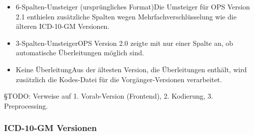 \begin{itemize}
\item 6-Spalten-Umsteiger (ursprüngliches Format)\newline Die Umsteiger für OPS Version 2.1 enthielen zusätzliche Spalten wegen Mehrfachverschlüsselung wie die älteren ICD-10-GM Versionen. 
\item 3-Spalten-Umsteiger\newline OPS Version 2.0 zeigte mit nur einer Spalte an, ob automatische Überleitungen möglich sind. 
\item Keine Überleitung\newline Aus der ältesten Version, die Überleitungen enthält, wird zusätzlich die Kodes-Datei für die Vorgänger-Versionen verarbeitet.
\end{itemize}

{\color{blue} §TODO: Verweise auf 1. Vorab-Version (Frontend), 2. Kodierung, 3. Preprocessing.}

\subsubsection{ICD-10-GM Versionen}

